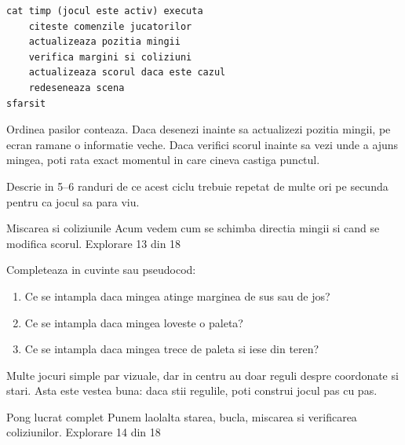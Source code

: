 \begin{examplebox}
\begin{lstlisting}[style=codequest]
cat timp (jocul este activ) executa
    citeste comenzile jucatorilor
    actualizeaza pozitia mingii
    verifica margini si coliziuni
    actualizeaza scorul daca este cazul
    redeseneaza scena
sfarsit
\end{lstlisting}
\end{examplebox}

\begin{missionbox}
Ordinea pasilor conteaza. Daca desenezi inainte sa actualizezi pozitia mingii, pe ecran ramane o informatie veche. Daca verifici scorul inainte sa vezi unde a ajuns mingea, poti rata exact momentul in care cineva castiga punctul.
\end{missionbox}

\begin{semibox}
Descrie in 5--6 randuri de ce acest ciclu trebuie repetat de multe ori pe secunda pentru ca jocul sa para viu.
\end{semibox}

\clearpage

\PageHeader
  {Miscarea si coliziunile}
  {Acum vedem cum se schimba directia mingii si cand se modifica scorul.}
  {Explorare 13 din 18}

\begin{guidebox}
Completeaza in cuvinte sau pseudocod:
\begin{enumerate}
\item Ce se intampla daca mingea atinge marginea de sus sau de jos?
\item Ce se intampla daca mingea loveste o paleta?
\item Ce se intampla daca mingea trece de paleta si iese din teren?
\end{enumerate}
\end{guidebox}

\begin{conceptbox}
Multe jocuri simple par vizuale, dar in centru au doar reguli despre coordonate si stari. Asta este vestea buna: daca stii regulile, poti construi jocul pas cu pas.
\end{conceptbox}

\clearpage

\PageHeader
  {Pong lucrat complet}
  {Punem laolalta starea, bucla, miscarea si verificarea coliziunilor.}
  {Explorare 14 din 18}

